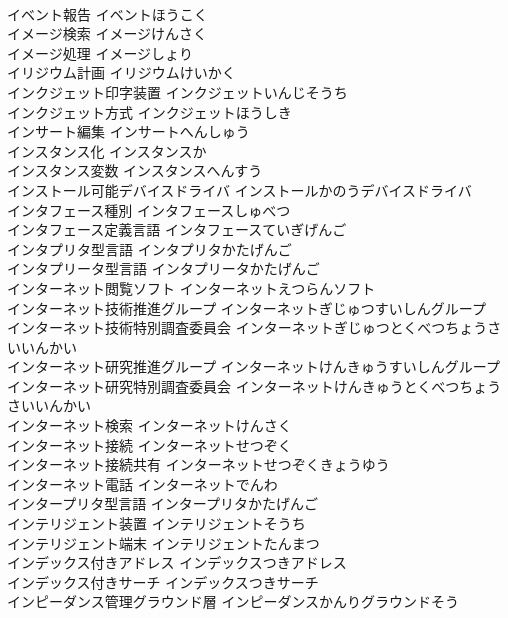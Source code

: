 \documentclass[8pt]{extreport}
\begin{document}
\begin{CJK}{UTF8}{min}
\\	イベント報告	イベントほうこく	
\\	イメージ検索	イメージけんさく	
\\	イメージ処理	イメージしょり	
\\	イリジウム計画	イリジウムけいかく	
\\	インクジェット印字装置	インクジェットいんじそうち	
\\	インクジェット方式	インクジェットほうしき	
\\	インサート編集	インサートへんしゅう	
\\	インスタンス化	インスタンスか	
\\	インスタンス変数	インスタンスへんすう	
\\	インストール可能デバイスドライバ	インストールかのうデバイスドライバ	
\\	インタフェース種別	インタフェースしゅべつ	
\\	インタフェース定義言語	インタフェースていぎげんご	
\\	インタプリタ型言語	インタプリタかたげんご	
\\	インタプリータ型言語	インタプリータかたげんご	
\\	インターネット閲覧ソフト	インターネットえつらんソフト	
\\	インターネット技術推進グループ	インターネットぎじゅつすいしんグループ	
\\	インターネット技術特別調査委員会	インターネットぎじゅつとくべつちょうさいいんかい	
\\	インターネット研究推進グループ	インターネットけんきゅうすいしんグループ	
\\	インターネット研究特別調査委員会	インターネットけんきゅうとくべつちょうさいいんかい	
\\	インターネット検索	インターネットけんさく	
\\	インターネット接続	インターネットせつぞく	
\\	インターネット接続共有	インターネットせつぞくきょうゆう	
\\	インターネット電話	インターネットでんわ	
\\	インタープリタ型言語	インタープリタかたげんご	
\\	インテリジェント装置	インテリジェントそうち	
\\	インテリジェント端末	インテリジェントたんまつ	
\\	インデックス付きアドレス	インデックスつきアドレス	
\\	インデックス付きサーチ	インデックスつきサーチ	
\\	インピーダンス管理グラウンド層	インピーダンスかんりグラウンドそう	

\end{CJK}
\end{document}
